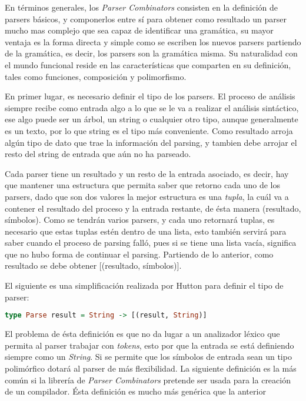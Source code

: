 En términos generales, los \emph{Parser Combinators} consisten en la definición de parsers básicos, y componerlos entre sí para obtener como resultado un parser mucho mas complejo que sea capaz de identificar una gramática, su mayor ventaja es la forma directa y simple como se escriben los nuevos parsers partiendo de la gramática, es decir, los parsers son la gramática misma. Su naturalidad con el mundo funcional reside en las características que comparten en su definición, tales como funciones, composición y polimorfismo.

En primer lugar, es necesario definir el tipo de los parsers. El proceso de análisis siempre recibe como entrada algo a lo que se le va a realizar el análisis sintáctico, ese algo puede ser un árbol, un string o cualquier otro tipo, aunque generalmente es un texto, por lo que string es el tipo más conveniente. Como resultado arroja algún tipo de dato que trae la información del parsing, y tambien debe arrojar el resto del string de entrada que aún no ha parseado.

Cada parser tiene un resultado y un resto de la entrada asociado, es decir, hay que mantener una estructura que permita saber que retorno cada uno de los parsers, dado que son dos valores la mejor estructura es una \emph{tupla}, la cuál va a contener el resultado del proceso y la entrada restante, de ésta manera (resultado, símbolos). Como se tendrán varios parsers, y cada uno retornará tuplas, es necesario que estas tuplas estén dentro de una lista, esto también servirá para saber cuando el proceso de parsing falló, pues si se tiene una lista vacía, significa que no hubo forma de continuar el parsing. Partiendo de lo anterior, como resultado se debe obtener [(resultado, símbolos)].

El siguiente es una simplificación realizada por Hutton para definir el tipo de parser: \cite{Hutton1996}
\begin{lstlisting}[language=Haskell]
type Parse result = String -> [(result, String)]
\end{lstlisting}

El problema de ésta definición es que no da lugar a un analizador léxico que permita al parser trabajar con \emph{tokens}, esto por que la entrada se está definiendo siempre como un \emph{String}. Si se permite que los símbolos de entrada sean un tipo polimórfico dotará al parser de más flexibilidad. La siguiente definición es la más común si la librería de \emph{Parser Combinators} pretende ser usada para la creación de un compilador. Ésta definición es mucho más genérica que la anterior \cite{Jeuring2010}

